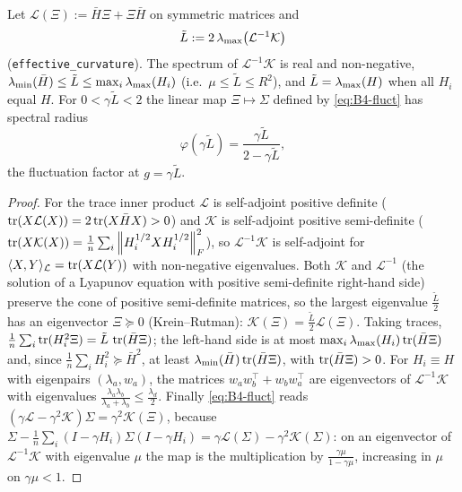 \begin{proposition}\label{prop:B4-Leff}
Let $\mathcal L(\Xi):=\bar H\Xi+\Xi\bar H$ on symmetric matrices and
\[
\tilde L:=2\,\lambda_{\max}\big(\mathcal L^{-1}\mathcal K\big)
\]
(\texttt{effective\_curvature}). The spectrum of $\mathcal L^{-1}\mathcal K$ is real and non-negative, $\lambda_{\min}(\bar H)\le\tilde L\le\max_i\lambda_{\max}(H_i)$ (i.e.\ $\mu\le\tilde L\le R^2$), and $\tilde L=\lambda_{\max}(H)$ when all $H_i$ equal $H$. For $0<\gamma\tilde L<2$ the linear map $\Xi\mapsto\Sigma$ defined by \eqref{eq:B4-fluct} has spectral radius
\[
\varphi(\gamma\tilde L)=\frac{\gamma\tilde L}{2-\gamma\tilde L},
\]
the fluctuation factor at $g=\gamma\tilde L$.
\end{proposition}
\begin{proof}
For the trace inner product $\mathcal L$ is self-adjoint positive definite ($\operatorname{tr}(X\mathcal L(X))=2\operatorname{tr}(X\bar HX)>0$) and $\mathcal K$ is self-adjoint positive semi-definite ($\operatorname{tr}(X\mathcal K(X))=\frac1n\sum_i\left\|H_i^{1/2}XH_i^{1/2}\right\|_F^2$), so $\mathcal L^{-1}\mathcal K$ is self-adjoint for $\langle X,Y\rangle_{\mathcal L}=\operatorname{tr}(X\mathcal L(Y))$ with non-negative eigenvalues. Both $\mathcal K$ and $\mathcal L^{-1}$ (the solution of a Lyapunov equation with positive semi-definite right-hand side) preserve the cone of positive semi-definite matrices, so the largest eigenvalue $\frac{\tilde L}2$ has an eigenvector $\Xi\succeq0$ (Krein--Rutman): $\mathcal K(\Xi)=\frac{\tilde L}2\mathcal L(\Xi)$. Taking traces, $\frac1n\sum_i\operatorname{tr}(H_i^2\Xi)=\tilde L\,\operatorname{tr}(\bar H\Xi)$; the left-hand side is at most $\max_i\lambda_{\max}(H_i)\operatorname{tr}(\bar H\Xi)$ and, since $\frac1n\sum_iH_i^2\succeq\bar H^2$, at least $\lambda_{\min}(\bar H)\operatorname{tr}(\bar H\Xi)$, with $\operatorname{tr}(\bar H\Xi)>0$. For $H_i\equiv H$ with eigenpairs $(\lambda_a,w_a)$, the matrices $w_aw_b^\top+w_bw_a^\top$ are eigenvectors of $\mathcal L^{-1}\mathcal K$ with eigenvalues $\frac{\lambda_a\lambda_b}{\lambda_a+\lambda_b}\le\frac{\lambda_d}2$. Finally \eqref{eq:B4-fluct} reads $(\gamma\mathcal L-\gamma^2\mathcal K)\Sigma=\gamma^2\mathcal K(\Xi)$, because $\Sigma-\frac1n\sum_i(I-\gamma H_i)\Sigma(I-\gamma H_i)=\gamma\mathcal L(\Sigma)-\gamma^2\mathcal K(\Sigma)$: on an eigenvector of $\mathcal L^{-1}\mathcal K$ with eigenvalue $\mu$ the map is the multiplication by $\frac{\gamma\mu}{1-\gamma\mu}$, increasing in $\mu$ on $\gamma\mu<1$.
\end{proof}

